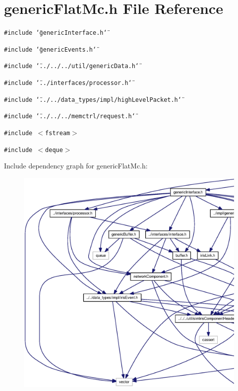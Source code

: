 \section{genericFlatMc.h File Reference}
\label{genericFlatMc_8h}
{\tt \#include \char`\"{}genericInterface.h\char`\"{}}\par
{\tt \#include \char`\"{}genericEvents.h\char`\"{}}\par
{\tt \#include \char`\"{}../../../util/genericData.h\char`\"{}}\par
{\tt \#include \char`\"{}../interfaces/processor.h\char`\"{}}\par
{\tt \#include \char`\"{}../../data\_\-types/impl/highLevelPacket.h\char`\"{}}\par
{\tt \#include \char`\"{}../../../memctrl/request.h\char`\"{}}\par
{\tt \#include $<$fstream$>$}\par
{\tt \#include $<$deque$>$}\par


Include dependency graph for genericFlatMc.h:\nopagebreak
\begin{figure}[H]
\begin{center}
\leavevmode
\includegraphics[width=420pt]{genericFlatMc_8h__incl}
\end{center}
\end{figure}


